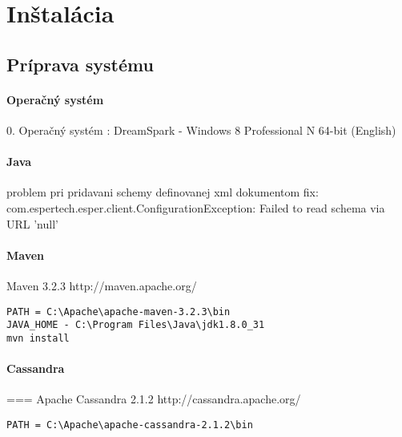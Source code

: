 \chapter{Inštalácia}
\section{Príprava systému}

\subsubsection{Operačný systém}
0. Operačný systém : DreamSpark - Windows 8 Professional N 64-bit (English)

\subsubsection{Java}
problem pri pridavani schemy definovanej xml dokumentom
fix: com.espertech.esper.client.ConfigurationException: Failed to read schema via URL 'null'
	
\subsubsection{Maven}
Maven 3.2.3	http://maven.apache.org/
\begin{lstlisting}[label=lst:crm,caption=Čiastočný výpis konfigurácie crm]
PATH = C:\Apache\apache-maven-3.2.3\bin
JAVA_HOME - C:\Program Files\Java\jdk1.8.0_31
mvn install
\end{lstlisting}

\subsubsection{Cassandra}
=== Apache Cassandra 2.1.2	http://cassandra.apache.org/
\begin{lstlisting}
PATH = C:\Apache\apache-cassandra-2.1.2\bin
\end{lstlisting}

